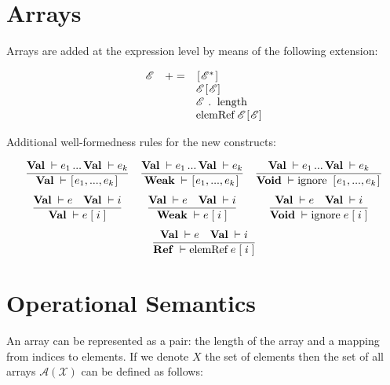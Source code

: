 \documentclass{article}
\author{Dmitry Boulytchev}
\newcommand{\trule}[2]{\dfrac{#1}{#2}}
\newcommand{\withenv}[2]{{#1}\vdash{#2}}
\newcommand{\llang}[1]{\mbox{\lstinline[mathescape]|#1|}}
\newcommand{\primi}[2]{\mathbf{#1}\;{#2}}
\theoremstyle{definition}
\begin{document}
\section{Arrays}

Arrays are added at the expression level by means of the following extension:

\[
\begin{array}{rcl}
  \mathscr E & += & \llang{[}\mathscr E^*\llang{]} \\
             &    & \mathscr E \llang{[$\mathscr E$]} \\
             &    & \mathscr E \;\llang{. length} \\
             &    & \llang{elemRef}\; \mathscr E\llang{[$\mathscr E$]}
\end{array}
\]

Additional well-formedness rules for the new constructs:

\renewcommand{\Ref}{\primi{Ref}{}}
\newcommand{\Val}{\primi{Val}{}}
\newcommand{\Void}{\primi{Void}{}}
\newcommand{\Weak}{\primi{Weak}{}}

\[
\begin{array}{ccc}
  \trule{\withenv{\Val}{e_1}\,...\,\withenv{\Val}{e_k}}{\withenv{\Val}{\llang{[}e_1,...,e_k\llang{]}}} &
  \trule{\withenv{\Val}{e_1}\,...\,\withenv{\Val}{e_k}}{\withenv{\Weak}{\llang{[}e_1,...,e_k\llang{]}}} &
  \trule{\withenv{\Val}{e_1}\,...\,\withenv{\Val}{e_k}}{\withenv{\Void}{\llang{ignore [}e_1,...,e_k\llang{]}}} \\[5mm]
  \trule{\withenv{\Val}{e}\quad\withenv{\Val}{i}}{\withenv{\Val}{\llang{$e\;$[$\;i\;$]}}} &
  \trule{\withenv{\Val}{e}\quad\withenv{\Val}{i}}{\withenv{\Weak}{\llang{$e\;$[$\;i\;$]}}} &
  \trule{\withenv{\Val}{e}\quad\withenv{\Val}{i}}{\withenv{\Void}{\llang{ignore $\;e\;$[$\;i\;$]}}}\\[5mm]
  \multicolumn{3}{c}{\trule{\withenv{\Val}{e}\quad\withenv{\Val}{i}}{\withenv{\Ref}{\llang{elemRef $\;e\;$[$\;i\;$]}}}}
\end{array}
\]

\section{Operational Semantics}

An array can be represented as a pair: the length of the array and a mapping from indices to elements. If we denote
$X$ the set of elements then the set of all arrays $\mathscr A (\mathscr X)$ can be defined as follows:
\end{document}
